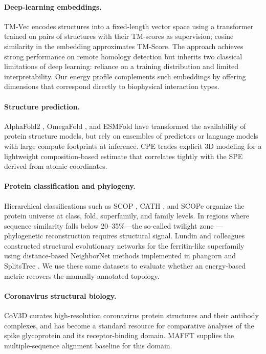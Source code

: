 \paragraph{Deep-learning embeddings.}
TM-Vec \citep{hamamsy2024tmvec} encodes structures into a fixed-length vector space using a transformer trained on pairs of structures with their TM-scores as supervision; cosine similarity in the embedding approximates TM-Score. The approach achieves strong performance on remote homology detection but inherits two classical limitations of deep learning: reliance on a training distribution and limited interpretability. Our energy profile complements such embeddings by offering dimensions that correspond directly to biophysical interaction types.

\paragraph{Structure prediction.}
AlphaFold2 \citep{jumper2021alphafold}, OmegaFold \citep{wu2022omegafold}, and ESMFold \citep{lin2023esmfold} have transformed the availability of protein structure models, but rely on ensembles of predictors or language models with large compute footprints at inference. CPE trades explicit 3D modeling for a lightweight composition-based estimate that correlates tightly with the SPE derived from atomic coordinates.

\paragraph{Protein classification and phylogeny.}
Hierarchical classifications such as SCOP \citep{murzin1995scop}, CATH \citep{orengo1997cath}, and SCOPe \citep{chandonia2019scope} organize the protein universe at class, fold, superfamily, and family levels. In regions where sequence similarity falls below 20--35\%---the so-called twilight zone \citep{chothia1986twilight}---phylogenetic reconstruction requires structural signal. Lundin and colleagues \citep{lundin2012ferritin} constructed structural evolutionary networks for the ferritin-like superfamily using distance-based NeighborNet methods implemented in phangorn \citep{schliep2011phangorn} and SplitsTree \citep{huson2024splitstree}. We use these same datasets to evaluate whether an energy-based metric recovers the manually annotated topology.

\paragraph{Coronavirus structural biology.}
CoV3D \citep{gowthaman2021cov3d} curates high-resolution coronavirus protein structures and their antibody complexes, and has become a standard resource for comparative analyses of the spike glycoprotein and its receptor-binding domain. MAFFT \citep{rozewicki2021mafft} supplies the multiple-sequence alignment baseline for this domain.

